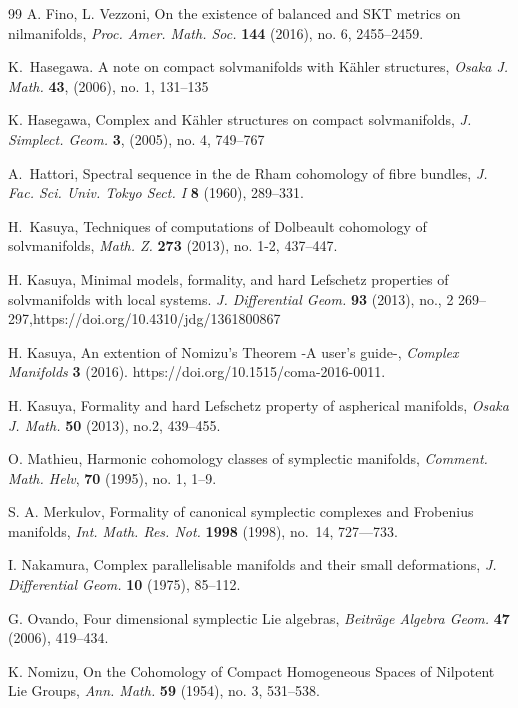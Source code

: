 \documentclass[a4paper, 11pt]{amsart}
\theoremstyle{plain}
\theoremstyle{definition}
\numberwithin{equation}{section}
\begin{document}
\begin{thebibliography}{99}
 A. Fino, L. Vezzoni, On the existence of balanced and SKT metrics on nilmanifolds, \textit{Proc. Amer. Math. Soc. } \textbf{144} (2016), no. 6, 2455--2459.

 K.\ Hasegawa. A note on compact solvmanifolds with Kähler structures, {\em Osaka J. Math.} {\bf 43}, (2006), no. 1, 131--135

 K. Hasegawa, Complex and K\"ahler structures on compact solvmanifolds, \textit{J. Simplect. Geom.} \textbf{3}, (2005), no. 4, 749--767

 A.\ Hattori, Spectral sequence in the de Rham cohomology of fibre bundles, {\em J. Fac. Sci. Univ. Tokyo Sect. I} {\bf 8} (1960), 289--331.

 H.\ Kasuya, Techniques of computations of Dolbeault cohomology of solvmanifolds, {\em Math. Z.} {\bf 273} (2013), no. 1-2, 437--447.

 H. Kasuya, Minimal models, formality, and hard Lefschetz properties of solvmanifolds with local systems. \textit{J. Differential Geom.} \textbf{93} (2013), no., 2 269--297,https://doi.org/10.4310/jdg/1361800867

 H. Kasuya, An extention of Nomizu's Theorem -A user's guide-,  {\em Complex Manifolds} \textbf{3} (2016). https://doi.org/10.1515/coma-2016-0011. 

 H. Kasuya, Formality and hard Lefschetz property of aspherical manifolds, \textit{Osaka J. Math.} \textbf{50} (2013), no.2, 439--455.

 O. Mathieu, Harmonic cohomology classes of symplectic manifolds, {\em Comment. Math. Helv}, {\bf 70} (1995), no. 1, 1--9.

 S. A. Merkulov, Formality of canonical symplectic complexes and Frobenius
manifolds,
{\em Int. Math. Res. Not.} \textbf{1998} (1998), no.~14, 727---733.

 I. Nakamura, Complex parallelisable manifolds and their small deformations, {\em J. Differential Geom.} {\bf 10} (1975),  85--112.

 G. Ovando, Four dimensional symplectic Lie algebras, \textit{Beitr\"age Algebra Geom.} \textbf{47} (2006), 419--434. 

 K. Nomizu, On the Cohomology of Compact Homogeneous Spaces of Nilpotent Lie Groups, \textit{Ann. Math.} \textbf{59} (1954), no. 3, 531--538.


\end{thebibliography}
\end{document}

